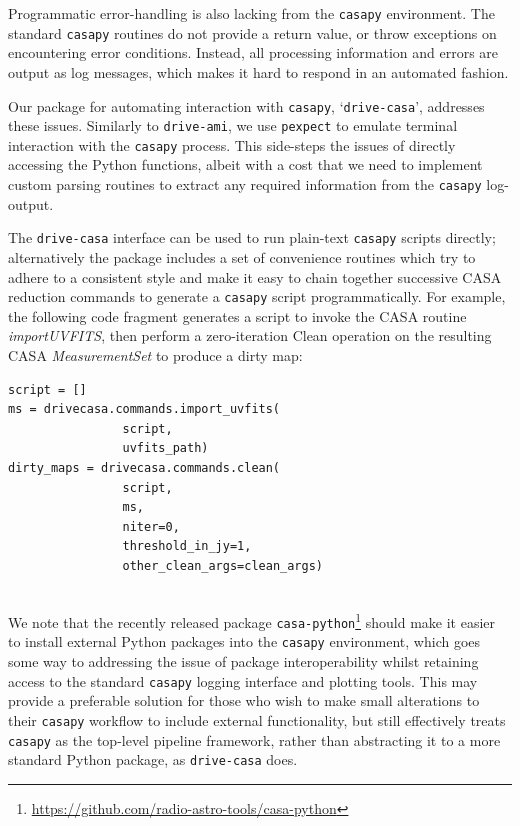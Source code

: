 \documentclass[5p,authoryear]{elsarticle}
\begin{document}
Programmatic error-handling is also lacking from the \texttt{casapy} environment. 
The standard \texttt{casapy} routines do not provide a return value, or throw exceptions on encountering error conditions. 
Instead, all processing information and errors are output as log messages, which makes it hard to respond in an automated fashion.

Our package for automating interaction with \texttt{casapy}, `\texttt{drive-casa}', addresses these issues.
Similarly to \texttt{drive-ami}, we use \texttt{pexpect} to emulate terminal interaction with the \texttt{casapy} process. 
This side-steps the issues of directly accessing the Python functions, albeit with a cost that we need to implement custom parsing routines to extract any required information from the \texttt{casapy} log-output. 

The \texttt{drive-casa} interface can be used to run plain-text \texttt{casapy} scripts directly; alternatively the package includes a set of convenience routines which try to adhere to a consistent style and make it easy to chain together successive CASA reduction commands to generate a \texttt{casapy} script programmatically.
For example, the following code fragment generates a script to invoke the CASA routine \mbox{\textit{importUVFITS}}, then perform a zero-iteration Clean operation on the resulting CASA \textit{MeasurementSet}
to produce a dirty map:


\begin{Verbatim}[samepage=true]
script = []
ms = drivecasa.commands.import_uvfits(
                script, 
                uvfits_path)
dirty_maps = drivecasa.commands.clean(
                script, 
                ms, 
                niter=0, 
                threshold_in_jy=1,
                other_clean_args=clean_args)
                
\end{Verbatim}

We note that the recently released package \texttt{casa-python}\footnote{%
\url{https://github.com/radio-astro-tools/casa-python}
}
should make it easier to install external Python packages into the \texttt{casapy} environment, which goes some way to addressing the issue of package interoperability whilst retaining access to the standard \texttt{casapy} logging interface and plotting tools. 
This may provide a preferable solution for those who wish to make small alterations to their \texttt{casapy} workflow to include external functionality, but still effectively treats \texttt{casapy} as the top-level pipeline framework, rather than abstracting it to a more standard Python package, as \texttt{drive-casa} does.
\end{document}
